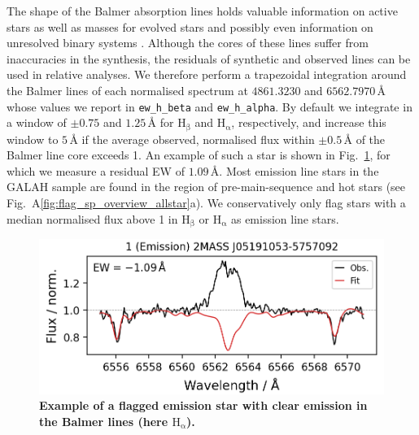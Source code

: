 \documentclass[
  journal=pasa,
  manuscript=research-paper, %
  year=2024,
  volume=37
]{cup-journal}
\begin{document}
The shape of the Balmer absorption lines holds valuable information on active stars as well as masses for evolved stars \citep{Bergemann2016} and possibly even information on unresolved binary systems \citep{Sayeed2024}. Although the cores of these lines suffer from inaccuracies in the synthesis, the residuals of synthetic and observed lines can be used in relative analyses. We therefore perform a trapezoidal integration around the Balmer lines of each normalised spectrum at $4861.3230$ and $6562.7970\,\text{\AA}$ whose values we report in \texttt{ew\_h\_beta} and \texttt{ew\_h\_alpha}. By default we integrate in a window of $\pm 0.75$ and $1.25\,\text{\AA}$ for $\text{H}_\upbeta$ and $\text{H}_\upalpha$, respectively, and increase this window to $5\,\text{\AA}$ if the average observed, normalised flux within $\pm 0.5\,\text{\AA}$ of the Balmer line core exceeds 1. An example of such a star is shown in Fig.~\ref{fig:examples_flag_sp_1}, for which we measure a residual EW of $1.09\,\text{\AA}$. Most emission line stars in the GALAH sample are found in the region of pre-main-sequence and hot stars (see Fig.~A\ref{fig:flag_sp_overview_allstar}a). We conservatively only flag stars with a median normalised flux above 1 in $\text{H}_\upbeta$ or $\text{H}_\upalpha$ as emission line stars.

\begin{figure}[ht]
 \centering
 \includegraphics[width=\textwidth]{figures/examples_flag_sp_1.png}
 \caption{\textbf{Example of a flagged emission star with clear emission in the Balmer lines (here $\mathrm{H_\upalpha}$).}}
 \label{fig:examples_flag_sp_1}
\end{figure}
\end{document}
